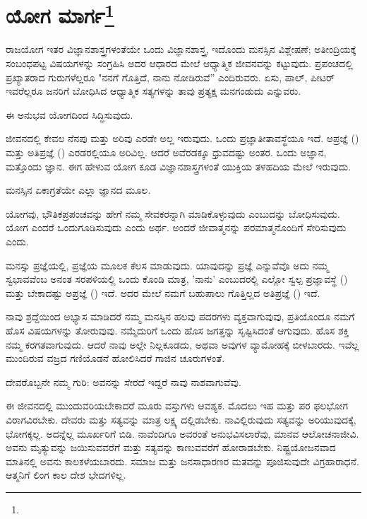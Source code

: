 
\chapter{ಯೋಗ ಮಾರ್ಗ\protect\footnote{}}

ರಾಜಯೋಗ ಇತರ ವಿಜ್ಞಾನಶಾಸ್ತ್ರಗಳಂತೆಯೇ ಒಂದು ವಿಜ್ಞಾನಶಾಸ್ತ್ರ, ಇದೊಂದು ಮನಸ್ಸಿನ ವಿಶ್ಲೇಷಣೆ; ಅತೀಂದ್ರಿಯಕ್ಕೆ ಸಂಬಂಧಪಟ್ಟ ವಿಷಯಗಳನ್ನು ಸಂಗ್ರಹಿಸಿ ಅದರ ಆಧಾರದ ಮೇಲೆ ಆಧ್ಯಾತ್ಮಿಕ ಜೀವನವನ್ನು ಕಟ್ಟುವುದು. ಪ್ರಪಂಚದಲ್ಲಿ ಪ್ರಖ್ಯಾತರಾದ ಗುರುಗಳೆಲ್ಲರೂ "ನನಗೆ ಗೊತ್ತಿದೆ, ನಾನು ನೋಡಿರುವೆ” ಎಂದಿರುವರು. ಏಸು, ಪಾಲ್, ಪೀಟರ್ ಇವರೆಲ್ಲರೂ ಜನರಿಗೆ ಬೋಧಿಸಿದ ಆಧ್ಯಾತ್ಮಿಕ ಸತ್ಯಗಳನ್ನು ತಾವು ಪ್ರತ್ಯಕ್ಷ ಮನಗಂಡುದು ಎನ್ನುವರು.

ಈ ಅನುಭವ ಯೋಗದಿಂದ ಸಿದ್ಧಿಸುವುದು.

ಜೀವನದಲ್ಲಿ ಕೇವಲ ನೆನಪು ಮತ್ತು ಅರಿವು ಎರಡೇ ಅಲ್ಲ ಇರುವುದು. ಒಂದು ಪ್ರಜ್ಞಾತೀತಾವಸ್ಥೆಯೂ ಇದೆ. ಅಪ್ರಜ್ಞೆ () ಮತ್ತು ಅತಿಪ್ರಜ್ಞೆ () ಎರಡರಲ್ಲಿಯೂ ಅರಿವಿಲ್ಲ. ಆದರೆ ಅವೆರಡಕ್ಕೂ ಧ್ರುವದಷ್ಟು ಅಂತರ. ಒಂದು ಅಜ್ಞಾನ, ಮತ್ತೊಂದು ಜ್ಞಾನ. ಈಗ ಹೇಳುವ ಯೋಗ ಕೂಡ ವಿಜ್ಞಾನಶಾಸ್ತ್ರಗಳಂತೆ ಯುಕ್ತಿಯ ತಳಹದಿಯ ಮೇಲೆ ಇರುವುದು.

ಮನಸ್ಸಿನ ಏಕಾಗ್ರತೆಯೇ ಎಲ್ಲಾ ಜ್ಞಾನದ ಮೂಲ.

ಯೋಗವು, ಭೌತಿಕಪ್ರಪಂಚವನ್ನು ಹೇಗೆ ನಮ್ಮ ಸೇವಕರನ್ನಾಗಿ ಮಾಡಿಕೊಳ್ಳುವುದು ಎಂಬುದನ್ನು ಬೋಧಿಸುವುದು. ಯೋಗ ಎಂದರೆ ಒಂದುಗೂಡಿಸುವುದು ಎಂದು ಅರ್ಥ. ಅಂದರೆ ಜೀವಾತ್ಮನನ್ನು ಪರಮಾತ್ಮನೊಂದಿಗೆ ಸೇರಿಸುವುದು ಎಂದು.

ಮನಸ್ಸು ಪ್ರಜ್ಞೆಯಲ್ಲಿ, ಪ್ರಜ್ಞೆಯ ಮೂಲಕ ಕೆಲಸ ಮಾಡುವುದು. ಯಾವುದನ್ನು ಪ್ರಜ್ಞೆ ಎನ್ನುವೆವೊ ಅದು ನಮ್ಮ ಸ್ವಭಾವವೆಂಬ ಅನಂತ ಸರಪಳಿಯಲ್ಲಿ ಒಂದು ಕೊಂಡಿ ಮಾತ್ರ, 'ನಾನು' ಎಂಬುದರಲ್ಲಿ ಎಲ್ಲೋ ಸ್ವಲ್ಪ ಪ್ರಜ್ಞಾವಸ್ಥೆ () ಮತ್ತು ಬೇಕಾದಷ್ಟು ಅಪ್ರಜ್ಞೆ () ಇದೆ. ಅದರ ಮೇಲೆ ನಮಗೆ ಬಹುಪಾಲು ಗೊತ್ತಿಲ್ಲದ ಅತಿಪ್ರಜ್ಞೆ () ಇದೆ.

ನಾವು ಶ್ರದ್ದೆಯಿಂದ ಅಭ್ಯಾಸ ಮಾಡಿದರೆ ನಮ್ಮ ಮನಸ್ಸಿನ ಹಲವು ಪದರಗಳು ವ್ಯಕ್ತವಾಗುವುವು, ಪ್ರತಿಯೊಂದೂ ನಮಗೆ ಹೊಸ ವಿಷಯಗಳನ್ನು ತೋರುವುವು. ನಮ್ಮೆದುರಿಗೆ ಒಂದು ಹೊಸ ಜಗತ್ತನ್ನು ಸೃಷ್ಟಿಸಿದಂತೆ ಆಗುವುದು. ಹೊಸ ಶಕ್ತಿ ನಮ್ಮ ಕರಗತವಾಗುವುದು. ಆದರೆ ನಾವು ಅಲ್ಲೇ ನಿಲ್ಲಕೂಡದು, ಅಥವಾ ಅವುಗಳ ವ್ಯಾಮೋಹಕ್ಕೆ ಬೀಳಬಾರದು. ಇವೆಲ್ಲ ಮುಂದಿರುವ ವಜ್ರದ ಗಣಿಯೊಡನೆ ಹೋಲಿಸಿದರೆ ಗಾಜಿನ ಚೂರುಗಳಂತೆ.

ದೇವರೊಬ್ಬನೇ ನಮ್ಮ ಗುರಿ: ಅವನನ್ನು ಸೇರದೆ ಇದ್ದರೆ ನಾವು ನಾಶವಾಗುವೆವು.

ಈ ಜೀವನದಲ್ಲಿ ಮುಂದುವರಿಯಬೇಕಾದರೆ ಮೂರು ವಸ್ತುಗಳು ಆವಶ್ಯಕ. ಮೊದಲು ಇಹ ಮತ್ತು ಪರ ಫಲಭೋಗ ವಿರಾಗವಿರಬೇಕು. ದೇವರು ಮತ್ತು ಸತ್ಯವನ್ನು ಮಾತ್ರ ಲಕ್ಷ್ಯ ದಲ್ಲಿಡಬೇಕು. ನಾವಿಲ್ಲಿರುವುದು ಸತ್ಯವನ್ನು ಅರಿಯುವುದಕ್ಕೆ, ಭೋಗಕ್ಕಲ್ಲ. ಅದನ್ನೆಲ್ಲ ಮೂರ್ಖರಿಗೆ ಬಿಡಿ. ನಾವೆಂದಿಗೂ ಅವರಂತೆ ಅನುಭವಿಸಲಾರೆವು, ಮಾನವ ಆಲೋಚನಾಜೀವಿ. ಅವನು ಮೃತ್ಯುವನ್ನು ಜಯಿಸುವವರೆಗೆ ಮತ್ತು ಸತ್ಯವನ್ನು ಕಾಣುವವರೆಗೆ ಹೋರಾಡಬೇಕು. ನಿಷ್ಟ್ರಯೋಜನವಾದ ಮಾತಿನಲ್ಲಿ ಅವನು ಕಾಲಕಳೆಯಬಾರದು. ಸಮಾಜ ಮತ್ತು ಜನಸಾಧಾರಣರ ಮತವನ್ನು ಪೂಜಿಸುವುದೇ ವಿಗ್ರಹಾರಾಧನೆ. ಆತ್ಮನಿಗೆ ಲಿಂಗ ಕಾಲ ದೇಶ ಭೇದಗಳಿಲ್ಲ.


